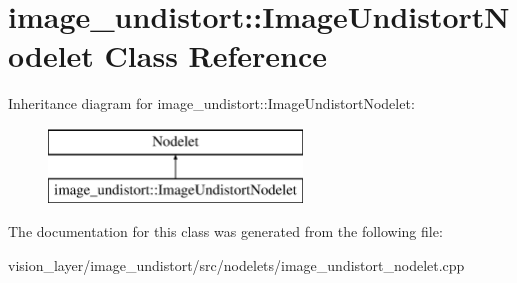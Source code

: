 \hypertarget{classimage__undistort_1_1ImageUndistortNodelet}{}\section{image\+\_\+undistort\+:\+:Image\+Undistort\+Nodelet Class Reference}
\label{classimage__undistort_1_1ImageUndistortNodelet}
Inheritance diagram for image\+\_\+undistort\+:\+:Image\+Undistort\+Nodelet\+:\begin{figure}[H]
\begin{center}
\leavevmode
\includegraphics[height=2.000000cm]{classimage__undistort_1_1ImageUndistortNodelet}
\end{center}
\end{figure}


The documentation for this class was generated from the following file\+:\begin{DoxyCompactItemize}
\item 
vision\+\_\+layer/image\+\_\+undistort/src/nodelets/image\+\_\+undistort\+\_\+nodelet.\+cpp\end{DoxyCompactItemize}
